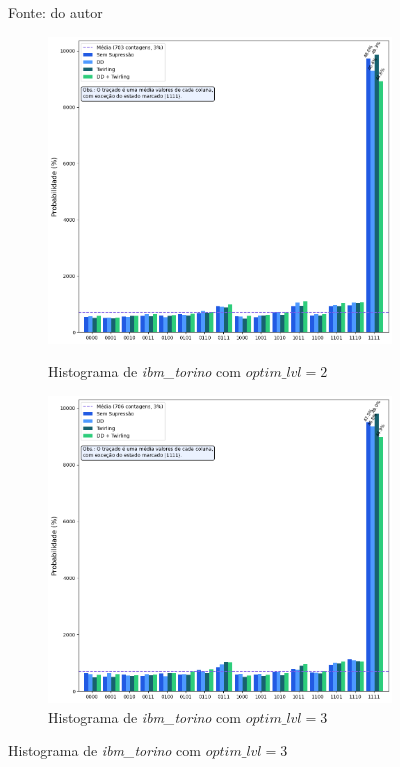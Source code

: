 \begin{figure}[ht!]
    \vspace{0.3em}
    {\small Fonte: do autor} 
\end{figure}

\begin{figure}[ht!]
    \centering
    \captionsetup{justification=centering}
    \caption{Resultados de \textit{ibm\_torino}}
    \label{fig: resultTorino}

    \begin{subfigure}[b]{0.46\textwidth}
        \centering
        \caption{Histograma de \textit{ibm\_torino} com $optim\_lvl = 2$}
        \includegraphics[width=\linewidth]{Imagens/resultTorino_2.png}
        \label{subFig: resultTorino_2}
    \end{subfigure}
    \hspace{1cm}
    \begin{subfigure}[b]{0.46\textwidth}
        \centering
        \caption{Histograma de \textit{ibm\_torino} com $optim\_lvl = 3$}
        \includegraphics[width=\linewidth]{Imagens/resultTorino_3.png}

\end{subfigure}
\end{figure}
